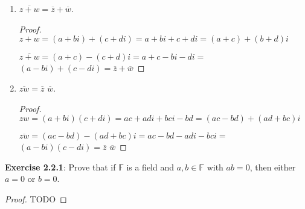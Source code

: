 \documentclass[a4paper]{article}
\begin{document}
\begin{myparindent}{0pt}
\begin{enumerate}[label=(\roman*)]
\begin{proof}
        $z + \overline{z} = (a + bi) + (a - bi) = 2a + bi - bi = 2a$ \newline

        Because $2 \in \mathbb{R}$ and $a \in \mathbb{R}$, and real numbers are
        closed under multiplication, $2a$ is also real, therefore
        $z + \overline{z}$ is real. \newline

        Next, we will prove that $z - \overline{z}$ is imaginary. \newline
        $z - \overline{z} = (a + bi) - (a - bi) = a - a + bi + bi = 2bi$. \newline

        Because $2 \in \mathbb{R}$ and $b \in \mathbb{R}$, and real numbers
        are closed under multiplication, then $2b \in \mathbb{R}$. Imaginary
        numbers are the set $\{ ci | c \in \mathbb{R} \}$. We can see that
        $2bi \in \{ ci | c \in \mathbb{R} \}$, therefore $z - \overline{z}$
        is imaginary.
    \end{proof}

  \item $\overline{z + w} = \overline{z} + \overline{w}$.
    \begin{proof}
        $z + w = (a + bi) + (c + di) = a + bi + c + di = (a + c) + (b + d)i$ \newline

        $\overline{z + w} = (a + c)- (c + d)i = a + c - bi - di = $
        $(a - bi) + (c - di) = \overline{z} + \overline{w}$
    \end{proof}

  \item $\overline{zw} = \overline{z}$ $\overline{w}$.
    \begin{proof}
        $zw = (a + bi)(c + di) = ac + adi + bci -bd = (ac - bd) + (ad + bc)i$ \newline

        $\overline{zw} = (ac - bd) - (ad + bc)i = ac - bd - adi - bci =$ \newline
        $(a - bi)(c - di) = \overline{z}$ $\overline{w}$
    \end{proof}
\end{enumerate}

\textbf{Exercise 2.2.1}:
Prove that if $\mathbb{F}$ is a field and $a, b \in \mathbb{F}$ with $ab = 0$,
then either $a = 0$ or $b = 0$.

\begin{proof}
TODO
\end{proof}


\end{myparindent}
\end{document}
